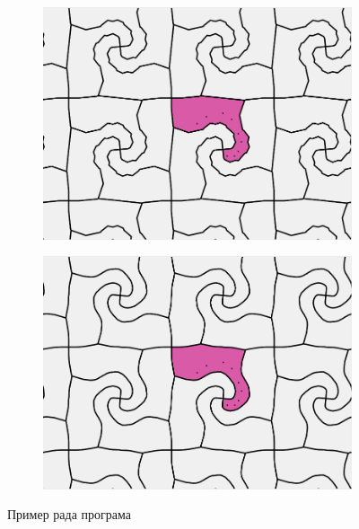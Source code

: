 \documentclass[12pt]{article}
\begin{document}
\begin{figure}[h]
\begin{subfigure}[b]{0.323\textwidth}
  \end{subfigure}

\quad


  \begin{subfigure}[b]{0.5\textwidth}
    \includegraphics[width=.9\textwidth]{s5.png}

  
  \end{subfigure}
  \begin{subfigure}[b]{0.5\textwidth}
    \includegraphics[width=.9\textwidth]{s6.png}

  \end{subfigure}
  \caption{Пример рада програма}
  \label{slk_rad}
\end{figure}
\end{document}
